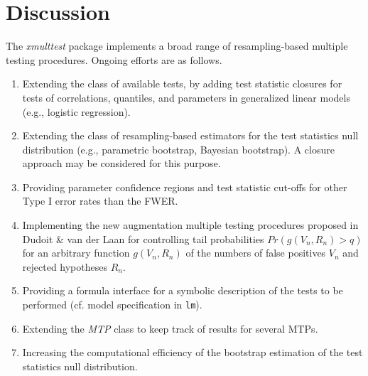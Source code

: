 \documentclass[11pt]{article}
\newcommand{\Rpackage}[1]{\textit{#1}}
\newcommand{\Robject}[1]{\texttt{#1}}
\newcommand{\Rclass}[1]{\textit{#1}}
\begin{document}
\section{Discussion}
\label{anal:mult:s:disc}

The \Rpackage{xmulttest} package implements a broad range of resampling-based multiple testing procedures. Ongoing efforts are as follows.
\begin{enumerate}
\item
Extending the class of available tests, by adding test statistic closures for tests of correlations, quantiles, and parameters in generalized linear models (e.g., logistic regression).
\item
Extending the class of resampling-based estimators for the test statistics null distribution (e.g., parametric bootstrap, Bayesian bootstrap). A closure approach may be considered for this purpose.
\item
Providing parameter confidence regions and test statistic cut-offs for other Type I error rates than the FWER.
\item
Implementing the new augmentation multiple testing procedures proposed in Dudoit \& van der Laan \cite{Dudoit&vdLaanMTBook} for controlling tail probabilities $Pr(g(V_n,R_n) > q)$ for an arbitrary function $g(V_n,R_n)$ of the numbers of false positives $V_n$ and rejected hypotheses $R_n$.
\item
Providing a formula interface for a symbolic description of the tests to be performed (cf. model specification in \Robject{lm}).
\item
Extending the \Rclass{MTP} class to keep track of results for several MTPs.
\item
Increasing the computational efficiency of the bootstrap estimation of the test statistics null distribution.
\end{enumerate}






\end{document}
